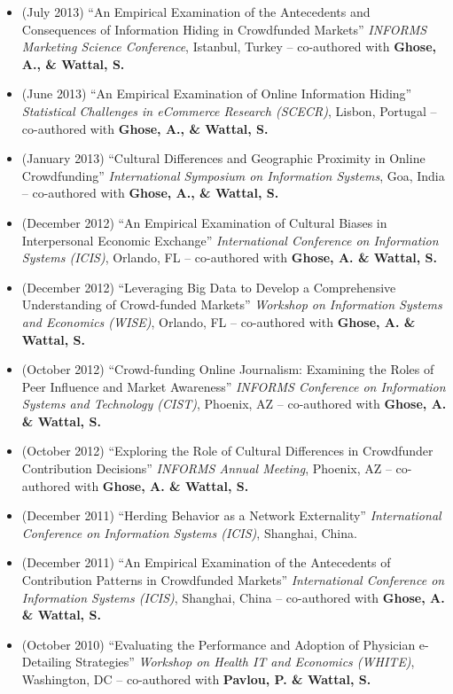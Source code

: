 \documentclass[10.5pt,letterpaper,sans]{moderncv}        %
\begin{document}
\begin{itemize}
\item (July 2013) ``An Empirical Examination of the Antecedents and Consequences of Information Hiding in Crowdfunded Markets'' \textit{INFORMS Marketing Science Conference}, Istanbul, Turkey -- co-authored with \textbf{Ghose, A., \& Wattal, S.}

\item (June 2013) ``An Empirical Examination of Online Information Hiding'' \textit{Statistical Challenges in eCommerce Research (SCECR)}, Lisbon, Portugal -- co-authored with \textbf{Ghose, A., \& Wattal, S.}

\item (January 2013) ``Cultural Differences and Geographic Proximity in Online Crowdfunding'' \textit{International Symposium on Information Systems}, Goa, India -- co-authored with \textbf{Ghose, A., \& Wattal, S.}

\item (December 2012) ``An Empirical Examination of Cultural Biases in Interpersonal Economic Exchange'' \textit{International Conference on Information Systems (ICIS)}, Orlando, FL -- co-authored with \textbf{Ghose, A. \& Wattal, S.}

\item (December 2012) ``Leveraging Big Data to Develop a Comprehensive Understanding of Crowd-funded Markets'' \textit{Workshop on Information Systems and Economics (WISE)}, Orlando, FL -- co-authored with \textbf{Ghose, A. \& Wattal, S.}

\item (October 2012) ``Crowd-funding Online Journalism: Examining the Roles of Peer Influence and Market Awareness'' \textit{INFORMS Conference on Information Systems and Technology (CIST)}, Phoenix, AZ -- co-authored with \textbf{Ghose, A. \& Wattal, S.}

\item (October 2012) ``Exploring the Role of Cultural Differences in Crowdfunder Contribution Decisions'' \textit{INFORMS Annual Meeting}, Phoenix, AZ -- co-authored with \textbf{Ghose, A. \& Wattal, S.}

\item (December 2011) ``Herding Behavior as a Network Externality'' \textit{International Conference on Information Systems (ICIS)}, Shanghai, China.

\item (December 2011) ``An Empirical Examination of the Antecedents of Contribution Patterns in Crowdfunded Markets'' \textit{International Conference on Information Systems (ICIS)}, Shanghai, China -- co-authored with \textbf{Ghose, A. \& Wattal, S.}

\item (October 2010) ``Evaluating the Performance and Adoption of Physician e-Detailing Strategies'' \textit{Workshop on Health IT and Economics (WHITE)}, Washington, DC -- co-authored with \textbf{Pavlou, P. \& Wattal, S.}

\end{itemize}
\end{document}
